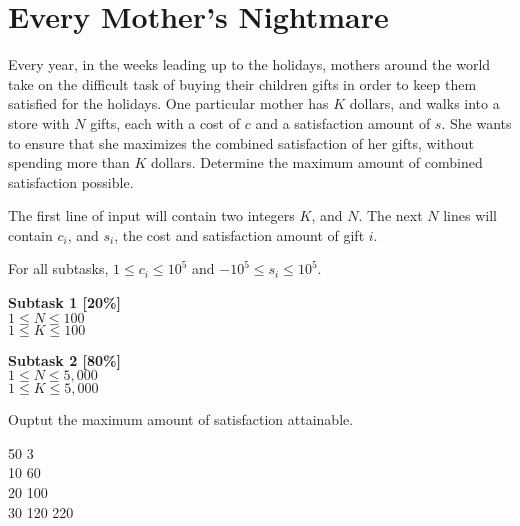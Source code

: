 \section{Every Mother's Nightmare}
Every year, in the weeks leading up to the holidays, mothers around the world take on the difficult task of buying their children gifts in order to keep them satisfied for the holidays. One particular mother has $K$ dollars, and walks into a store with $N$ gifts, each with a cost of $c$ and a satisfaction amount of $s$. She wants to ensure that she maximizes the combined satisfaction of her gifts, without spending more than $K$ dollars. Determine the maximum amount of combined satisfaction possible.

The first line of input will contain two integers $K$, and $N$. The next $N$ lines will contain $c_i$, and $s_i$, the cost and satisfaction amount of gift $i$.

\constraints
For all subtasks, $1 \leq c_i \leq 10^5$ and $-10^5 \leq s_i \leq 10^5$.

\textbf{Subtask 1 [20\%]} \\
$1 \leq N \leq 100$ \\
$1 \leq K \leq 100$

\textbf{Subtask 2 [80\%]} \\
$1 \leq N \leq 5,000$ \\
$1 \leq K \leq 5,000$

\outputformat
Ouptut the maximum amount of satisfaction attainable.

\addsample
{
    50 3 \\
    10 60 \\
    20 100 \\
    30 120
}
{
    220
}